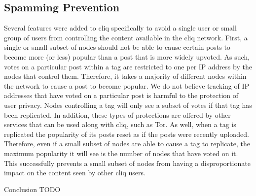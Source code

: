 \documentclass{sig-alternate}
\begin{document}
\subsection{Spamming Prevention}
\label{subsec:spam}

Several features were added to cliq specifically to avoid a single user or small group of users from controlling the content available in the cliq network.
First, a single or small subset of nodes should not be able to cause certain posts to become more (or less) popular than a post that is more widely upvoted.
As such, votes on a particular post within a tag are restricted to one per IP address by the nodes that control them. 
Therefore, it takes a majority of different nodes within the network to cause a post to become popular. 
We do not believe tracking of IP addresses that have voted on a particular post is harmful to the protection of user privacy. 
Nodes controlling a tag will only see a subset of votes if that tag has been replicated. 
In addition, these types of protections are offered by other services that can be used along with cliq, such as Tor. 
As well, when a tag is replicated the popularity of its posts reset as if the posts were recently uploaded. 
Therefore, even if a small subset of nodes are able to cause a tag to replicate, the maximum popularity it will see is the number of nodes that have voted on it. 
This successfully prevents a small subset of nodes from having a disproportionate impact on the content seen by other cliq users. 

\begin{section}{Conclusion}
  TODO
\end{section}



\end{document}
